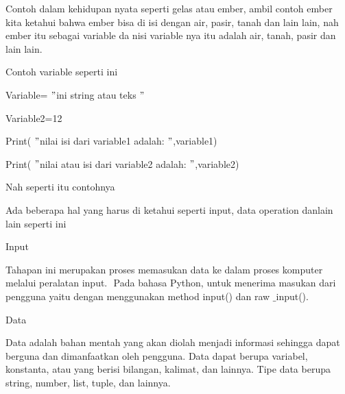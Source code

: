 \noindent 
{\fontsize{14pt}{14pt}\selectfont Contoh dalam kehidupan nyata seperti gelas atau ember, ambil contoh ember kita ketahui bahwa ember bisa di isi dengan air, pasir, tanah dan lain lain, nah ember itu sebagai variable da nisi variable nya itu adalah air, tanah, pasir dan lain lain. \\} \par
\vspace{14pt}
\noindent 
{\fontsize{14pt}{14pt}\selectfont Contoh variable seperti ini \\} \par
\noindent 
{\fontsize{14pt}{14pt}\selectfont Variable=  $ " $ini string atau teks $ " $ \\} \par
\noindent 
{\fontsize{14pt}{14pt}\selectfont Variable2=12 \\} \par
\vspace{14pt}
\noindent 
{\fontsize{14pt}{14pt}\selectfont Print( $ " $nilai isi dari variable1 adalah: $ " $,variable1) \\} \par
\noindent 
{\fontsize{14pt}{14pt}\selectfont Print( $ " $nilai atau isi dari variable2 adalah: $ " $,variable2) \\} \par
\noindent 
{\fontsize{14pt}{14pt}\selectfont Nah seperti itu contohnya \\} \par
\vspace{14pt}
\noindent 
{\fontsize{14pt}{14pt}\selectfont Ada beberapa hal yang harus di ketahui seperti input, data operation danlain lain seperti ini \\} \par
\vspace{14pt}
\noindent 
{\fontsize{14pt}{14pt}\selectfont Input \\} \par
\noindent 
{\fontsize{14pt}{14pt}\selectfont Tahapan ini merupakan proses memasukan data ke dalam proses komputer melalui peralatan $  $input. $  $ Pada bahasa Python, untuk menerima masukan dari pengguna yaitu dengan menggunakan $  $method input() $  $dan $  $raw $  \_  $input(). \\} \par
\noindent 
{\fontsize{14pt}{14pt}\selectfont Data \\} \par
\noindent 
{\fontsize{14pt}{14pt}\selectfont Data adalah bahan mentah yang akan diolah menjadi informasi sehingga dapat berguna dan dimanfaatkan oleh pengguna. Data dapat berupa variabel, konstanta, atau yang berisi bilangan, kalimat, dan lainnya. Tipe data berupa string, number, list, tuple, dan lainnya. \\} \par
